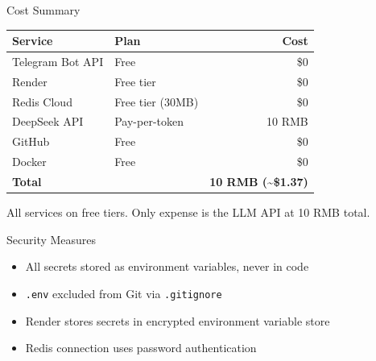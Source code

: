 \documentclass[aspectratio=169,11pt]{beamer}
\begin{document}
\begin{frame}{Cost Summary}
\begin{tabular}{llr}
\toprule
\textbf{Service} & \textbf{Plan} & \textbf{Cost} \\
\midrule
Telegram Bot API & Free & \$0 \\
Render & Free tier & \$0 \\
Redis Cloud & Free tier (30MB) & \$0 \\
DeepSeek API & Pay-per-token & 10 RMB \\
GitHub & Free & \$0 \\
Docker & Free & \$0 \\
\midrule
\textbf{Total} & & \textbf{10 RMB (\textasciitilde\$1.37)} \\
\bottomrule
\end{tabular}

\vspace{0.4cm}
All services on free tiers. Only expense is the LLM API at 10 RMB total.
\end{frame}

\begin{frame}{Security Measures}
\begin{itemize}
\item All secrets stored as environment variables, never in code
\item \texttt{.env} excluded from Git via \texttt{.gitignore}
\item Render stores secrets in encrypted environment variable store
\item Redis connection uses password authentication
\end{itemize}
\end{frame}
\end{document}
